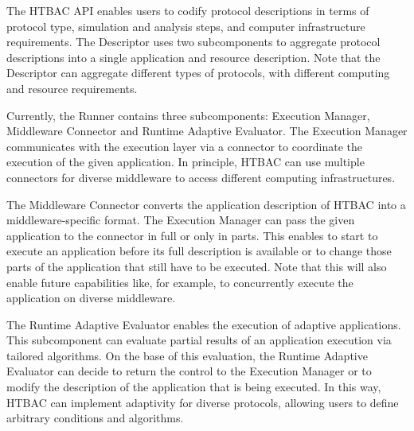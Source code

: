 The HTBAC API enables users to codify protocol descriptions in terms of
protocol type, simulation and analysis steps, and computer infrastructure
requirements. The Descriptor uses two subcomponents to aggregate protocol
descriptions into a single application and resource description. Note that
the Descriptor can aggregate different types of protocols, with different
computing and resource requirements.

Currently, the Runner contains three subcomponents: Execution Manager,
Middleware Connector and Runtime Adaptive Evaluator. The Execution Manager
communicates with the execution layer via a connector to coordinate the
execution of the given application. In principle, HTBAC can use multiple
connectors for diverse middleware to access different computing
infrastructures. 



The Middleware Connector converts the application description of HTBAC into a
middleware-specific format. The Execution Manager can pass the given
application to the connector in full or only in parts. This enables to start
to execute an application before its full description is available or to
change those parts of the application that still have to be executed. Note
that this will also enable future capabilities like, for example, to
concurrently execute the application on diverse middleware.

The Runtime Adaptive Evaluator enables the execution of adaptive
applications. This subcomponent can evaluate partial results of an
application execution via tailored algorithms. On the base of this
evaluation, the Runtime Adaptive Evaluator can decide to return the control
to the Execution Manager or to modify the description of the application that
is being executed. In this way, HTBAC can implement adaptivity for diverse
protocols, allowing users to define arbitrary conditions and algorithms.



